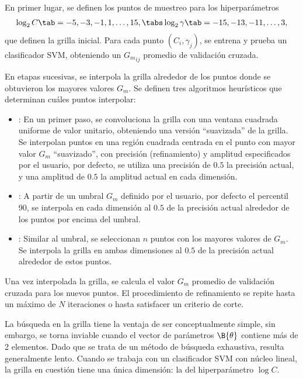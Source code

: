 En primer lugar, se definen los puntos de muestreo para los
hiperparámetros
%
\begin{align}
  \label{initial-grid}
  \log_2 C     \tab= -5, -3, -1, 1, \ldots, 15, \tabs
  \log_2\gamma \tab= -15,-13, -11, \ldots, 3,
\end{align}
%
que definen la grilla inicial. Para cada punto $(C_i,\gamma_j)$, se
entrena y prueba un clasificador SVM, obteniendo un ${G_m}_{ij}$
promedio de validación cruzada.

En etapas sucesivas, se interpola la grilla alrededor de los puntos
donde se obtuvieron los mayores valores $G_m$. Se definen tres
algoritmos heurísticos que determinan cuáles puntos interpolar:
%
\begin{itemize}
%
\item {}: En un primer paso, se convoluciona la grilla con una
  ventana cuadrada uniforme de valor unitario, obteniendo una versión
  ``suavizada'' de la grilla. Se interpolan puntos en una región
  cuadrada centrada en el punto con mayor valor $G_m$ ``suavizado'',
  con precisión (refinamiento) y amplitud especificados por el
  usuario, por defecto, se utiliza una precisión de $0.5$ la precisión
  actual, y una amplitud de $0.5$ la amplitud actual en cada
  dimensión.
%
\item {}: A partir de un umbral $G_m$ definido por el usuario,
  por defecto el percentil 90, se interpola en cada dimensión al $0.5$
  de la precisión actual alrededor de los puntos por encima del
  umbral.
%
\item {}: Similar al umbral, se seleccionan $n$ puntos
  con los mayores valores de $G_m$. Se interpola la grilla en ambas
  dimensiones al $0.5$ de la precisión actual alrededor de estos
  puntos.
%
\end{itemize}
%
Una vez interpolada la grilla, se calcula el valor $G_m$ promedio de
validación cruzada para los nuevos puntos. El procedimiento de
refinamiento se repite hasta un máximo de $N$ iteraciones o hasta
satisfacer un criterio de corte.

La búsqueda en la grilla tiene la ventaja de ser conceptualmente
simple, sin embargo, se torna inviable cuando el vector de parámetros
$\B{\theta}$ contiene más de 2 elementos. Dado que se trata de un
método de búsqueda exhaustiva, resulta generalmente lento.  Cuando se
trabaja con un clasificador SVM con núcleo lineal, la grilla en
cuestión tiene una única dimensión: la del hiperparámetro $\log C$.
